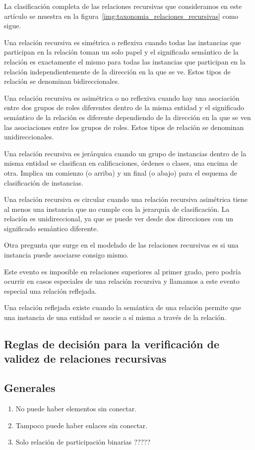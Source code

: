La clasificación completa de las relaciones recursivas que consideramos en este artículo se muestra en la figura~\ref{img:taxonomia_relaciones_recursivas} como sigue.


Una relación recursiva es simétrica o reflexiva cuando todas las instancias que participan en la relación toman un solo papel y el significado semántico de la relación es exactamente el mismo para todas las instancias que participan en la relación independientemente de la dirección en la que se ve. Estos tipos de relación se denominan bidireccionales.


Una relación recursiva es asimétrica o no reflexiva cuando hay una asociación entre dos grupos de roles diferentes dentro de la misma entidad y el significado semántico de la relación es diferente dependiendo de la dirección en la que se ven las asociaciones entre los grupos de roles. Estos tipos de relación se denominan unidireccionales.


Una relación recursiva es jerárquica cuando un grupo de instancias dentro de la misma entidad se clasifican en calificaciones, órdenes o clases, una encima de otra. Implica un comienzo (o arriba) y un final (o abajo) para el esquema de clasificación de instancias.


Una relación recursiva es circular cuando una relación recursiva asimétrica tiene al menos una instancia que no cumple con la jerarquía de clasificación. La relación es unidireccional, ya que se puede ver desde dos direcciones con un significado semántico diferente.


Otra pregunta que surge en el modelado de las relaciones recursivas es si una instancia
puede asociarse consigo mismo. 


Este evento es imposible en relaciones superiores al primer grado, pero podría ocurrir en casos especiales de una relación recursiva y llamamos a este evento especial una relación reflejada. 

Una relación reflejada existe cuando la semántica de una relación permite que una instancia de una entidad se asocie a sí misma a través de la relación.

\subsection{Reglas de decisión para la verificación de validez de relaciones recursivas}




\subsection{Generales}
\begin{enumerate}
    \item No puede haber elementos sin conectar.
    \item Tampoco puede haber enlaces sin conectar.
    \item Solo relación de participación binarias ?????
\end{enumerate}




